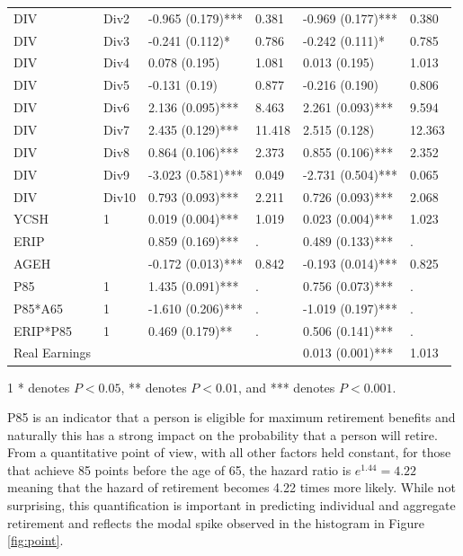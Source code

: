 \begin{table}[htbp]
\begin{threeparttable}
\begin{tabular}{llL{2.5cm}L{1.5cm}L{2.5cm}L{1.5cm}}
			DIV & Div2  & -0.965 (0.179)*** & 0.381 & -0.969 (0.177)*** & 0.380 \\
			DIV & Div3  & -0.241 (0.112)* & 0.786 & -0.242 (0.111)* & 0.785 \\
			DIV & Div4  & 0.078 (0.195) & 1.081 & 0.013 (0.195) & 1.013 \\
			DIV & Div5  & -0.131 (0.19) & 0.877 & -0.216 (0.190) & 0.806 \\
			DIV & Div6  & 2.136 (0.095)*** & 8.463 & 2.261 (0.093)*** & 9.594 \\
			DIV & Div7  & 2.435 (0.129)*** & 11.418 & 2.515 (0.128) & 12.363 \\
			DIV & Div8  & 0.864 (0.106)*** & 2.373 & 0.855 (0.106)*** & 2.352 \\
			DIV & Div9  & -3.023 (0.581)*** & 0.049 & -2.731 (0.504)*** & 0.065 \\
			DIV & Div10 & 0.793 (0.093)*** & 2.211 & 0.726 (0.093)*** & 2.068 \\
			YCSH  & 1     & 0.019 (0.004)*** & 1.019 & 0.023 (0.004)*** & 1.023 \\
			ERIP  &       & 0.859 (0.169)*** & .     & 0.489 (0.133)*** & . \\
			AGEH  &       & -0.172 (0.013)*** & 0.842 & -0.193 (0.014)*** & 0.825 \\
			P85   & 1     & 1.435 (0.091)*** & .     & 0.756 (0.073)*** & . \\
			P85*A65 & 1     & -1.610 (0.206)*** & .     & -1.019 (0.197)*** & . \\
			ERIP*P85 & 1     & 0.469 (0.179)** & .     & 0.506 (0.141)*** & . \\
			Real Earnings &       &       &       & 0.013 (0.001)*** & 1.013 \\
			\bottomrule
		\end{tabular}%
		\begin{tablenotes}
			\item[1] * denotes $P<0.05$, ** denotes $P<0.01$, and *** denotes $P<0.001$.
		\end{tablenotes}
	\end{threeparttable}
	\label{tab:paraest.}%
\end{table}%
P85 is an indicator that a person is eligible for maximum retirement benefits and naturally this has a strong impact on the probability that a person will retire.  From a quantitative point of view, with all other factors held constant, for those that achieve 85 points before the age of 65, the hazard ratio is $e^{1.44} = 4.22$ meaning that the hazard of retirement becomes 4.22 times more likely.  While not surprising, this quantification is important in predicting individual and aggregate retirement and reflects the modal spike observed in the histogram in Figure \ref{fig:point}.

